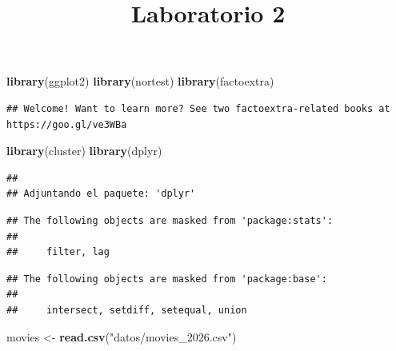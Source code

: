 \documentclass[
]{article}
\title{Laboratorio 2}
\author{}
\date{\vspace{-2.5em}}
\newenvironment{Shaded}{\begin{snugshade}}{\end{snugshade}}
\newcommand{\FunctionTok}[1]{\textcolor[rgb]{0.13,0.29,0.53}{\textbf{#1}}}
\newcommand{\NormalTok}[1]{#1}
\newcommand{\OtherTok}[1]{\textcolor[rgb]{0.56,0.35,0.01}{#1}}
\newcommand{\StringTok}[1]{\textcolor[rgb]{0.31,0.60,0.02}{#1}}
\begin{document}
\maketitle

\begin{Shaded}
\begin{Highlighting}[]
\FunctionTok{library}\NormalTok{(ggplot2)}
\FunctionTok{library}\NormalTok{(nortest)}
\FunctionTok{library}\NormalTok{(factoextra)}
\end{Highlighting}
\end{Shaded}

\begin{verbatim}
## Welcome! Want to learn more? See two factoextra-related books at https://goo.gl/ve3WBa
\end{verbatim}

\begin{Shaded}
\begin{Highlighting}[]
\FunctionTok{library}\NormalTok{(cluster)}
\FunctionTok{library}\NormalTok{(dplyr)}
\end{Highlighting}
\end{Shaded}

\begin{verbatim}
## 
## Adjuntando el paquete: 'dplyr'
\end{verbatim}

\begin{verbatim}
## The following objects are masked from 'package:stats':
## 
##     filter, lag
\end{verbatim}

\begin{verbatim}
## The following objects are masked from 'package:base':
## 
##     intersect, setdiff, setequal, union
\end{verbatim}

\begin{Shaded}
\begin{Highlighting}[]
\NormalTok{movies }\OtherTok{\textless{}{-}} \FunctionTok{read.csv}\NormalTok{(}\StringTok{"datos/movies\_2026.csv"}\NormalTok{)}
\end{Highlighting}
\end{Shaded}
\end{document}
